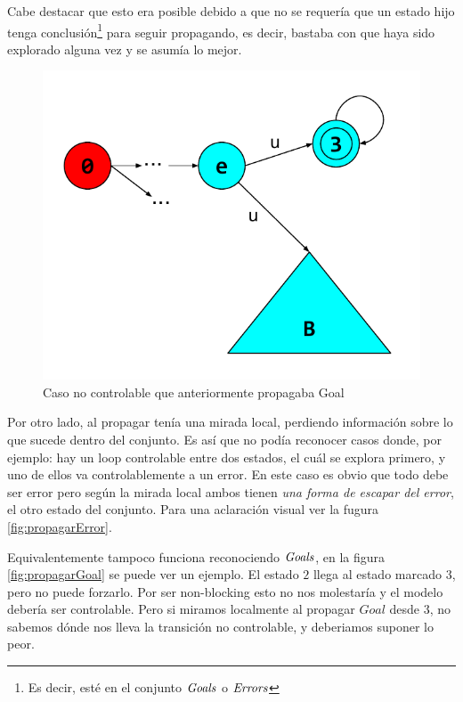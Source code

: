 Cabe destacar que esto era posible debido a que no se requería que un estado hijo tenga conclusión\footnote{Es decir, esté en el conjunto $\mathit{Goals}$ o $\mathit{Errors}$} para seguir propagando, es decir, bastaba con que haya sido explorado alguna vez y se asumía lo mejor.
\begin{figure}[htb]
 \centering
 \includegraphics[width=\linewidth/2]{figures/FalenciasErrores.pdf}
 \caption{Caso no controlable que anteriormente propagaba Goal}
 \label{fig:falenciasErrores}
\end{figure}

Por otro lado, al propagar tenía una mirada local, perdiendo información sobre lo que sucede dentro del conjunto. Es así que no podía reconocer casos donde, por ejemplo: hay un loop controlable entre dos estados, el cuál se explora primero, y uno de ellos va controlablemente a un error. En este caso es obvio que todo debe ser error pero según la mirada local ambos tienen \textit{una forma de escapar del error}, el otro estado del conjunto. Para una aclaración visual ver la fugura \ref{fig:propagarError}.

Equivalentemente tampoco funciona reconociendo $\mathit{Goals}$, en la figura \ref{fig:propagarGoal} se puede ver un ejemplo. El estado $2$ llega al estado marcado $3$, pero no puede forzarlo. Por ser non-blocking esto no nos molestaría y el modelo debería ser controlable. Pero si miramos localmente al propagar $Goal$ desde $3$, no sabemos dónde nos lleva la transición no controlable, y deberiamos suponer lo peor.

